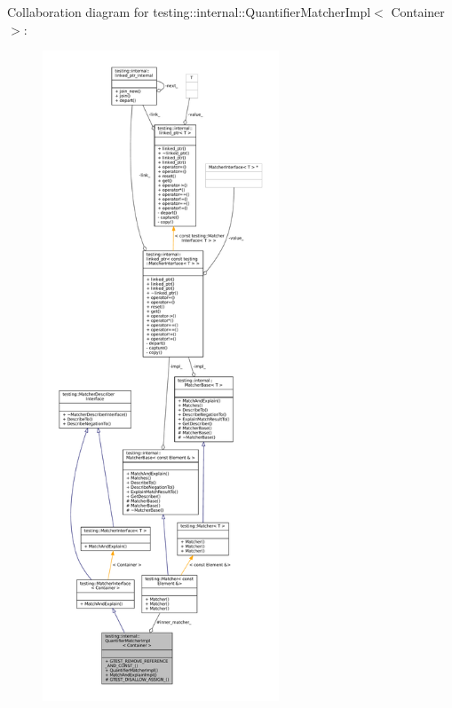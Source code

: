 Collaboration diagram for testing\+:\+:internal\+:\+:Quantifier\+Matcher\+Impl$<$ Container $>$\+:
\nopagebreak
\begin{figure}[H]
\begin{center}
\leavevmode
\includegraphics[height=550pt]{classtesting_1_1internal_1_1QuantifierMatcherImpl__coll__graph}
\end{center}
\end{figure}
